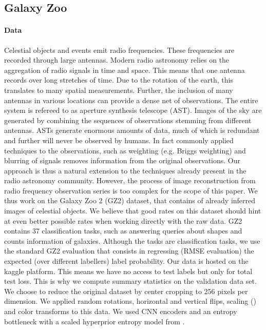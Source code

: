\documentclass[final]{article}
\begin{document}
\subsection{Galaxy Zoo}
\label{appx:reproducability_galaxy}
 \paragraph{Data}
Celestial objects and events emit radio frequencies. These frequencies are recorded through large antennas. 
Modern radio astronomy relies on the aggregation of radio signals in time and space. This means that one antenna records over long stretches of time. Due to the rotation of the earth, this translates to many spatial measurements. Further, the inclusion of many antennas in various locations can provide a dense net of observations. The entire system is refereed to as aperture synthesis telescope (AST). 
Images of the sky are generated by combining the sequences of observations stemming from different antennas. 
ASTs generate enormous amounts of data, much of which is redundant and further will never be observed by humans.
In fact commonly applied techniques to the observations, such as weighting (e.g. Briggs weighting) and blurring of signals removes information from the original observations. 
Our approach is thus a natural extension to the techniques already present in the radio astronomy community.
However, the process of image reconstruction from radio frequency observation series is too complex for the scope of this paper. 
We thus work on the Galaxy Zoo 2 (GZ2) dataset, that contains of already inferred images of celestial objects. 
We believe that good rates on this dataset should hint at even better possible rates when working directly with the raw data.
GZ2 contains 37 classification tasks, such as answering queries about shapes and counts information of galaxies.
Although the tasks are classification tasks, we use the standard GZ2 evaluation that consists in regressing (RMSE evaluation) the expected (over different labellers) label probability.
Our data is hosted on the kaggle platform.
This means we have no access to test labels but only for total test loss. 
This is why we compute summary statistics on the validation data set.
We choose to reduce the original dataset by center cropping to 256 pixels per dimension.
We applied random rotations, horizontal and vertical flips, scaling () and color transforms to this data. 
We used CNN encoders \cite{balle_end--end_2017,minnen_joint_2018} and an entropy bottleneck with a scaled hyperprior entropy model from \cite{balle_variational_2018}.
 
\end{document}
